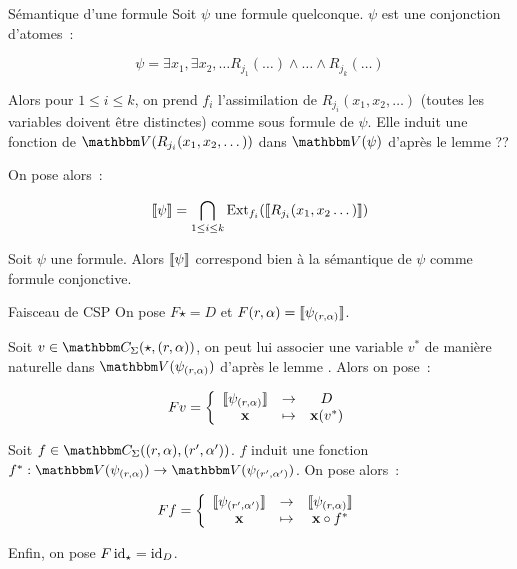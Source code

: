 \begin{defi}{Sémantique d'une formule}
    Soit $\psi$ une formule quelconque. $\psi$ est une conjonction d'atomes~:

    \[ \psi = \exists x_1,\exists x_2,\dots
                  R_{j_1}(\dots)\wedge\dots\wedge R_{j_k}(\dots) \]

    Alors pour $1\leq i\leq k$, on prend $f_i$ l'assimilation de
    $R_{j_i}(x_1, x_2, \dots)$ (toutes les variables doivent être distinctes) comme
    sous formule de $\psi$. Elle induit une fonction de $\V(R_{j_i}(x_1, x_2, \dots))$
    dans $\V(\psi)$ d'après le lemme ?? %

    On pose alors~:

    \[ \llbracket {\psi} \rrbracket = \bigcap_{1\leq i\leq k} \text{Ext}_{f_i}(\llbracket {R_{j_i}(x_1, x_2\dots)} \rrbracket) \]
\end{defi}

\begin{lem}
    Soit $\psi$ une formule. Alors $\llbracket {\psi} \rrbracket$ correspond bien à la sémantique de
    $\psi$ comme formule conjonctive.
\end{lem}


\begin{defi}{Faisceau de CSP}
    On pose $F\star = D$ et $F(r,\alpha) = \llbracket {\psi_{(r,\alpha)}} \rrbracket$.

    Soit $v\in\C_\Sigma(\star, (r,\alpha))$, on peut lui associer une variable
    $v^*$ de manière naturelle dans $\V(\psi_{(r,\alpha)})$ d'après le lemme %
    . Alors on pose~:
    
    \[ Fv = \left\{\begin{array}{ccc}
                       \llbracket {\psi_{(r,\alpha)}} \rrbracket & \rightarrow & D              \\
                             \mathbf{x}        & \mapsto     & \mathbf{x}(v^*) \\
    \end{array}\right.\]

    Soit $f\in\C_\Sigma((r,\alpha), (r',\alpha'))$. $f$ induit une fonction
    $f^* : \V(\psi_{(r,\alpha)})\rightarrow\V(\psi_{(r',\alpha')})$. On pose alors~:

    \[ Ff = \left\{\begin{array}{ccc}
                    \llbracket {\psi_{(r',\alpha')}} \rrbracket & \rightarrow & \llbracket {\psi_{(r,\alpha)}} \rrbracket \\
                           \mathbf{x}         & \mapsto     & \mathbf{x} \circ f^* \\
    \end{array}\right.\]

    Enfin, on pose $F\operatorname{id}_\star = \operatorname{id}_D$.
\end{defi}

